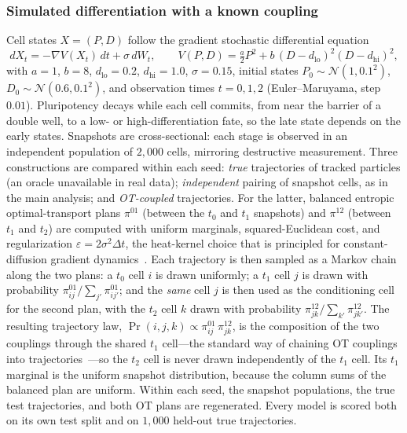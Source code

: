\documentclass[pdflatex,sn-mathphys-num]{sn-jnl}
\theoremstyle{thmstyleone}%
\theoremstyle{thmstyletwo}%
\theoremstyle{thmstylethree}%
\begin{document}
\subsubsection{Simulated differentiation with a known coupling} Cell states $X=(P,D)$ follow the gradient stochastic differential equation
\begin{equation}
dX_t=-\nabla V(X_t)\,dt+\sigma\,dW_t,\qquad V(P,D)=\tfrac{a}{2}P^2+b\,(D-d_{\mathrm{lo}})^2(D-d_{\mathrm{hi}})^2,
\label{eq:sde}
\end{equation}
with $a=1$, $b=8$, $d_{\mathrm{lo}}=0.2$, $d_{\mathrm{hi}}=1.0$, $\sigma=0.15$, initial states $P_0\sim\mathcal{N}(1,0.1^2)$, $D_0\sim\mathcal{N}(0.6,0.1^2)$, and observation times $t=0,1,2$ (Euler--Maruyama, step $0.01$). Pluripotency decays while each cell commits, from near the barrier of a double well, to a low- or high-differentiation fate, so the late state depends on the early states. Snapshots are cross-sectional: each stage is observed in an independent population of $2{,}000$ cells, mirroring destructive measurement. Three constructions are compared within each seed: \emph{true} trajectories of tracked particles (an oracle unavailable in real data); \emph{independent} pairing of snapshot cells, as in the main analysis; and \emph{OT-coupled} trajectories. For the latter, balanced entropic optimal-transport plans $\pi^{01}$ (between the $t_0$ and $t_1$ snapshots) and $\pi^{12}$ (between $t_1$ and $t_2$) are computed with uniform marginals, squared-Euclidean cost, and regularization $\varepsilon=2\sigma^2\Delta t$, the heat-kernel choice that is principled for constant-diffusion gradient dynamics~\cite{lavenant2024toward}. Each trajectory is then sampled as a Markov chain along the two plans: a $t_0$ cell $i$ is drawn uniformly; a $t_1$ cell $j$ is drawn with probability $\pi^{01}_{ij}/\sum_{j'}\pi^{01}_{ij'}$; and the \emph{same} cell $j$ is then used as the conditioning cell for the second plan, with the $t_2$ cell $k$ drawn with probability $\pi^{12}_{jk}/\sum_{k'}\pi^{12}_{jk'}$. The resulting trajectory law, $\Pr(i,j,k)\propto\pi^{01}_{ij}\,\pi^{12}_{jk}$, is the composition of the two couplings through the shared $t_1$ cell---the standard way of chaining OT couplings into trajectories~\cite{schiebinger2019optimal}---so the $t_2$ cell is never drawn independently of the $t_1$ cell. Its $t_1$ marginal is the uniform snapshot distribution, because the column sums of the balanced plan are uniform. Within each seed, the snapshot populations, the true test trajectories, and both OT plans are regenerated. Every model is scored both on its own test split and on $1{,}000$ held-out true trajectories.
\end{document}
